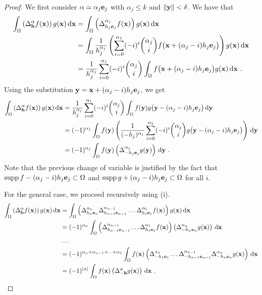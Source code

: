 \begin{proof}
 We first consider $\alpha = \alpha_j \mathbf{e}_j$ with
$\alpha_j \leq k$ and $\|\mathbf{y}\|< \delta$.  We have that
\begin{align*}
\int_{\Omega} \left(\Delta^\alpha_{\mathbf{h}} f (\mathbf{x})\right)
g(\mathbf{x}) \,\mathrm{d}{\mathbf{x}}
&= \int_{\Omega} \left(\Delta^{\alpha_j}_{h_j \mathbf{e}_j} f(\mathbf{x})\right)
g(\mathbf{x}) \,\mathrm{d}{\mathbf{x}} \\
&= \int_{\Omega} \frac{1}{h_j^{\alpha_j}}
\left( \sum_{i=0}^{\alpha_1} (-i)^i \binom{\alpha_j}{i}
f\big(\mathbf{x} + (\alpha_j-i) h_j \mathbf{e}_j\big) \right)
g(\mathbf{x})\,\mathrm{d}{\mathbf{x}} \\
&= \frac{1}{h_j^{\alpha_j}} \sum_{i=0}^{\alpha_1} (-i)^i \binom{\alpha_j}{i}
\int_{\Omega} f\big(\mathbf{x} + (\alpha_j-i) h_j \mathbf{e}_j\big)
g(\mathbf{x})\,\mathrm{d}{\mathbf{x}} \ .
\end{align*}
Using the substitution $\mathbf{y} = \mathbf{x} + (\alpha_j-i)h_j\mathbf{e}_j$,
we get
\begin{align*}
\int_{\Omega} \left(\Delta^\alpha_{\mathbf{h}} f (\mathbf{x})\right)
g(\mathbf{x}) \,\mathrm{d}{\mathbf{x}}
&= \frac{1}{h_j^{\alpha_j}} \sum_{i=0}^{\alpha_1} (-i)^i \binom{\alpha_j}{i}
\int_{\Omega} f(\mathbf{y}) g\big(\mathbf{y} - (\alpha_j-i) h_j \mathbf{e}_j\big)
\,\mathrm{d}{\mathbf{y}} \\
&= (-1)^{\alpha_j} \int_{\Omega} f(\mathbf{y}) \left( \frac{1}{(-h_j)^{\alpha_j}}
\sum_{i=0}^{\alpha_1} (-i)^i \binom{\alpha_j}{i}
g\big(\mathbf{y} - (\alpha_j-i) h_j \mathbf{e}_j\big) \right) \,\mathrm{d}{\mathbf{y}} \\
&= (-1)^{\alpha_j} \int_{\Omega} f(\mathbf{y})
\left(\Delta^{\alpha_j}_{-h_j \mathbf{e}_j} g
(\mathbf{y})\right)  \,\mathrm{d}{\mathbf{y}} \ .
\end{align*}
Note that the previous change of variable is justified by the fact that
$\operatorname{supp} f - (\alpha_j -i)h_j\mathbf{e}_j \subset \Omega$
and
$\operatorname{supp} g + (\alpha_j -i)h_j\mathbf{e}_j \subset \Omega$
for all $i$.

 For the general case, we proceed recursively using (i).
\begin{align*}
\int_{\Omega} \left(\Delta^\alpha_{\mathbf{h}} f (\mathbf{x})\right) g(\mathbf{x})
\,\mathrm{d}{\mathbf{x}}
&= \int_{\Omega} \left(
\Delta_{h_n\mathbf{e}_n}^{\alpha_n} \Delta_{h_{n-1}\mathbf{e}_{n-1}}^{\alpha_{n-1}} \ldots
\Delta_{h_1\mathbf{e}_1}^{\alpha_1} f (\mathbf{x})\right) g(\mathbf{x}) \,\mathrm{d}{\mathbf{x}} \\
&= (-1)^{\alpha_n} \int_{\Omega} \left(
\Delta_{h_{n-1}\mathbf{e}_{n-1}}^{\alpha_{n-1}} \ldots
\Delta_{h_1\mathbf{e}_1}^{\alpha_1} f (\mathbf{x})\right)
\left( \Delta_{-h_n\mathbf{e}_n}^{\alpha_n}  g(\mathbf{x}) \right) \,\mathrm{d}{\mathbf{x}} \\
& \ldots \\
&= (-1)^{\alpha_n + \alpha_{n-1} + \ldots + \alpha_1}
\int_{\Omega} f(\mathbf{x}) \left( \Delta_{-h_1\mathbf{e}_1}^{\alpha_1} \ldots
\Delta_{-h_{n-1}\mathbf{e}_{n-1}}^{\alpha_{n-1}} \Delta_{-h_n\mathbf{e}_n}^{\alpha_n}
g(\mathbf{x})\right) \,\mathrm{d}{\mathbf{x}} \\
&= (-1)^{|\alpha|} \int_{\Omega} f(\mathbf{x})
\left(\Delta^\alpha_{-\mathbf{h}} g (\mathbf{x})\right) \,\mathrm{d}{\mathbf{x}} \ .
\qedhere
\end{align*}
\end{proof}

